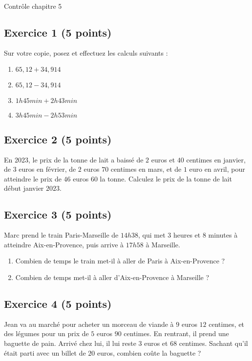 \documentclass[14 pt]{extarticle}
\theoremstyle{plain}
\begin{document}
  
  \newpage 

\begin{center}{\Large Contrôle chapitre 5}\\ 
 \end{center}
  
    \subsection*{Exercice 1 (5 points)}
  
Sur votre copie, posez et effectuez les calculs suivants : \begin{enumerate}
\item $65,12 + 34, 914$
\item $65,12 - 34, 914$
\item $1 h 45 min + 2h 43 min$
\item $3 h 45 min - 2h 53 min$
\end{enumerate}  

\subsection*{Exercice 2 (5 points)}

En 2023, le prix de la tonne de lait a baissé de $2$ euros et $40$ centimes en janvier, de $3$ euros en février, de $2$ euros $70$ centimes en mars, et de $1$ euro en avril, pour atteindre le prix de $46$ euros $60$ la tonne. Calculez le prix de la tonne de lait début janvier $2023$. 


\subsection*{Exercice 3 (5 points)}

Marc prend le train Paris-Marseille de $14h38$, qui met $3$ heures et $8$ minutes à atteindre Aix-en-Provence, puis arrive à $17h58$ à Marseille.
\begin{enumerate}
\item Combien de temps le train met-il à aller de Paris à Aix-en-Provence ? 
\item Combien de temps met-il à aller d'Aix-en-Provence à Marseille ? 
\end{enumerate} 




\subsection*{Exercice 4 (5 points)}

Jean va au marché pour acheter un morceau de viande à $9$ euros $12$ centimes, et des légumes pour un prix de $5$ euros $90$ centimes. En rentrant, il prend une baguette de pain. Arrivé chez lui, il lui reste $3$ euros et $68$ centimes. Sachant qu'il était parti avec un billet de $20$ euros, combien coûte la baguette ?
  
 	
\end{document}
